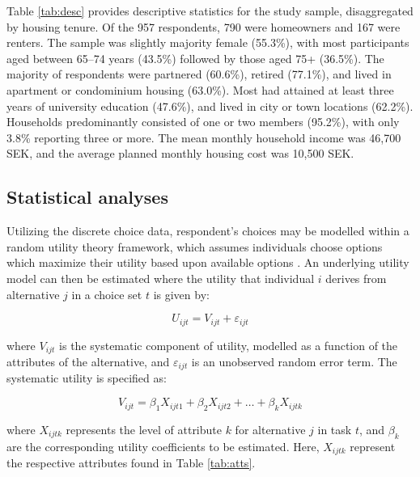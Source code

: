 \documentclass[3p,11pt ]{elsarticle}
\begin{document}
Table \ref{tab:desc} provides descriptive statistics for the study sample, disaggregated by housing tenure.
Of the 957 respondents, 790 were homeowners and 167 were renters.
The sample was slightly majority female (55.3\%), with most participants aged between 65–74 years (43.5\%) followed by those aged 75+ (36.5\%).
The majority of respondents were partnered (60.6\%), retired (77.1\%), and lived in apartment or condominium housing (63.0\%).
Most had attained at least three years of university education (47.6\%), and lived in city or town locations (62.2\%).
Households predominantly consisted of one or two members (95.2\%), with only 3.8\% reporting three or more.
The mean monthly household income was 46,700 SEK, and the average planned monthly housing cost was 10,500 SEK.





\clearpage




\subsection{Statistical analyses}

Utilizing the discrete choice data,
respondent's choices may be modelled within a random utility theory framework,
which assumes individuals choose options which maximize their utility based upon available options \citep{lancsarConductingDiscreteChoice2008}.
An underlying utility model can then be estimated where the utility that individual \( i \) derives from alternative \( j \) in a choice set \( t \) is given by:

\begin{equation}
U_{ijt} = V_{ijt} + \varepsilon_{ijt}
\end{equation}

\noindent where \( V_{ijt} \) is the systematic component of utility, modelled as a function of the attributes of the alternative, and \( \varepsilon_{ijt} \) is an unobserved random error term.
The systematic utility is specified as:

\begin{equation}
V_{ijt} = \beta_1 X_{ijt1} + \beta_2 X_{ijt2} + \ldots + \beta_k X_{ijtk}
\end{equation}

\noindent where \( X_{ijtk} \) represents the level of attribute \( k \) for alternative \( j \) in task \( t \), and \( \beta_k \) are the corresponding utility coefficients to be estimated.
Here,
\( X_{ijtk} \) represent the respective attributes found in Table \ref{tab:atts}.
\end{document}
